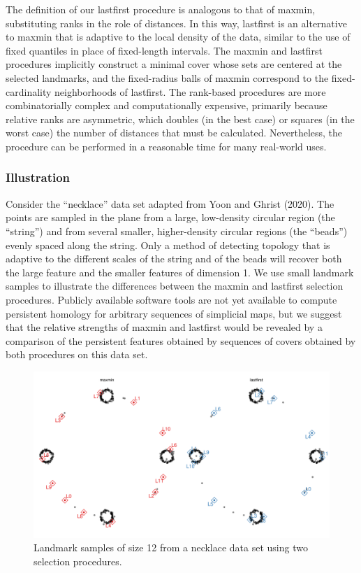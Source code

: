 \documentclass{article}
\begin{document}
The definition of our lastfirst procedure is analogous to that of
maxmin, substituting ranks in the role of distances. In this way,
lastfirst is an alternative to maxmin that is adaptive to the local
density of the data, similar to the use of fixed quantiles in place of
fixed-length intervals. The maxmin and lastfirst procedures implicitly
construct a minimal cover whose sets are centered at the selected
landmarks, and the fixed-radius balls of maxmin correspond to the
fixed-cardinality neighborhoods of lastfirst. The rank-based procedures
are more combinatorially complex and computationally expensive,
primarily because relative ranks are asymmetric, which doubles (in the
best case) or squares (in the worst case) the number of distances that
must be calculated. Nevertheless, the procedure can be performed in a
reasonable time for many real-world uses.

\hypertarget{illustration}{%
\subsubsection{Illustration}\label{illustration}}

Consider the ``necklace'' data set adapted from Yoon and Ghrist (2020).
The points are sampled in the plane from a large, low-density circular
region (the ``string'') and from several smaller, higher-density
circular regions (the ``beads'') evenly spaced along the string. Only a
method of detecting topology that is adaptive to the different scales of
the string and of the beads will recover both the large feature and the
smaller features of dimension 1. We use small landmark samples to
illustrate the differences between the maxmin and lastfirst selection
procedures. Publicly available software tools are not yet available to
compute persistent homology for arbitrary sequences of simplicial maps,
but we suggest that the relative strengths of maxmin and lastfirst would
be revealed by a comparison of the persistent features obtained by
sequences of covers obtained by both procedures on this data set.

\begin{figure}
\includegraphics[width=\textwidth]{necklace-landmarks}
\caption{
Landmark samples of size 12 from a necklace data set using two selection procedures.
\label{fig:necklace}
}
\end{figure}
\end{document}
